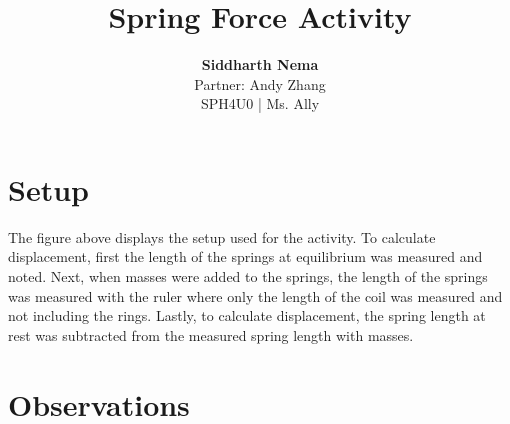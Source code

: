 \documentclass[12pt,letterpaper]{article}
\title{\textbf{Spring Force Activity}}
\author{\textbf{Siddharth Nema} \\Partner: Andy Zhang \\SPH4U0 | Ms.\hspace{-1mm} Ally}
\begin{document}
\maketitle
\newpage
\section{Setup}


The figure above displays the setup used for the activity.
To calculate displacement, first the length of the springs at equilibrium was measured and noted.
Next, when masses were added to the springs, the length of the springs was measured with the ruler where only the length of the coil was measured and not including the rings.
Lastly, to calculate displacement, the spring length at rest was subtracted from the measured spring length with masses.
\section{Observations}

\newpage
\end{document}
